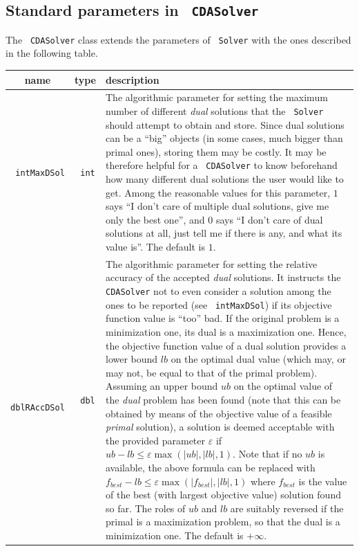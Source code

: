 \documentclass[a4paper]{article}
\newcommand{\code}[1]{\textrm{\texttt{\hyphenchar\font=200 #1}}}
\def\Solver{\code{Solver}\xspace}
\begin{document}
\subsection{Standard parameters in \code{CDASolver}}

The \code{CDASolver} class extends the parameters of \Solver with the ones described  in the following table.

\begin{longtable}{|c|c|p{13.5cm}|}
 \hline
 name & type & description \\
 \hline
 \code{intMaxDSol} & \code{int} & The algorithmic parameter for setting the maximum number of different \emph{dual} solutions that the \Solver should attempt to obtain and store. Since dual solutions can be a ``big'' objects (in some cases, much bigger than primal ones), storing them may be costly. It may be therefore helpful for a \code{CDASolver} to know beforehand how many different dual solutions the user would like to get. Among the reasonable values for this parameter, $1$ says ``I don't care of multiple dual solutions, give me only the best one'', and $0$ says ``I don't care of dual solutions at all, just tell me if there is any, and what its value is''. The default is $1$. \\
 \hline
 \code{dblRAccDSol} & \code{dbl} & The algorithmic parameter for setting the relative accuracy of the accepted \emph{dual} solutions. It instructs the \code{CDASolver} not to even consider a solution among the ones to be reported (see \code{intMaxDSol}) if its objective function value is ``too'' bad. If the original problem is a minimization one, its dual is a maximization one. Hence, the objective function value of a dual solution provides a lower bound $lb$ on the optimal dual value (which may, or may not, be equal to that of the primal problem). Assuming an upper bound $ub$ on the optimal value of the \emph{dual} problem has been found (note that this can be obtained by means of the objective value of a feasible \emph{primal} solution), a solution is deemed acceptable with the provided parameter $\varepsilon$ if $ub - lb \leq \varepsilon \max( |ub| , |lb| , 1 )$. Note that if no $ub$ is available, the above formula can be replaced with $f_{best} - lb \leq \varepsilon \max( |f_{best}| , |lb| , 1 )$ where $f_{best}$ is the value of the best (with largest objective value) solution found so far. The roles of $ub$ and $lb$ are suitably reversed if the primal is a maximization problem, so that the dual is a minimization one. The default is $+\infty$. \\

\end{longtable}
\end{document}
